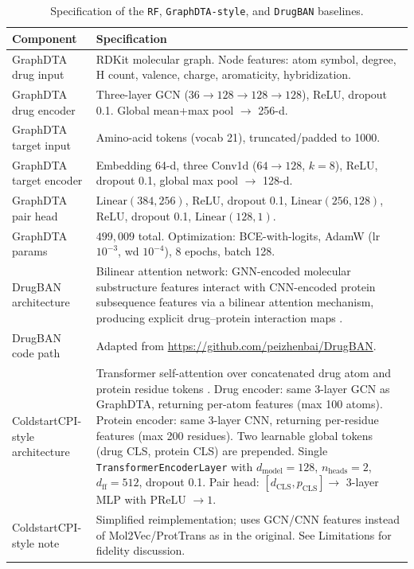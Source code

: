 \documentclass[referee,pdflatex,sn-basic,Numbered]{sn-jnl}
\begin{document}
\begin{appendices}
\begin{table}[t]
  \centering
  \scriptsize
  \caption{Specification of the \texttt{RF}, \texttt{GraphDTA-style}, and \texttt{DrugBAN} baselines.}
  \label{tab:graph-spec}
  \setlength{\tabcolsep}{3.5pt}
  \begin{tabular*}{\textwidth}{@{\extracolsep{\fill}}lp{}@{}}
    \toprule
    Component & Specification \\
    \midrule
    GraphDTA drug input & RDKit molecular graph. Node features: atom symbol, degree, H count, valence, charge, aromaticity, hybridization. \\
    GraphDTA drug encoder & Three-layer GCN ($36 \to 128 \to 128 \to 128$), ReLU, dropout 0.1. Global mean+max pool $\to$ 256-d. \\
    GraphDTA target input & Amino-acid tokens (vocab 21), truncated/padded to 1000. \\
    GraphDTA target encoder & Embedding 64-d, three Conv1d ($64 \to 128$, $k=8$), ReLU, dropout 0.1, global max pool $\to$ 128-d. \\
    GraphDTA pair head & $\mathrm{Linear}(384,256)$, ReLU, dropout 0.1, $\mathrm{Linear}(256,128)$, ReLU, dropout 0.1, $\mathrm{Linear}(128,1)$. \\
    GraphDTA params & $499{,}009$ total. Optimization: BCE-with-logits, AdamW (lr $10^{-3}$, wd $10^{-4}$), 8 epochs, batch 128. \\
    \midrule
    DrugBAN architecture & Bilinear attention network: GNN-encoded molecular substructure features interact with CNN-encoded protein subsequence features via a bilinear attention mechanism, producing explicit drug--protein interaction maps \citep{bai2023drugban}. \\
    DrugBAN code path & Adapted from \url{https://github.com/peizhenbai/DrugBAN}. \\
    \midrule
    ColdstartCPI-style architecture & Transformer self-attention over concatenated drug atom and protein residue tokens \citep{zhao2025coldstartcpi}. Drug encoder: same 3-layer GCN as GraphDTA, returning per-atom features (max 100 atoms). Protein encoder: same 3-layer CNN, returning per-residue features (max 200 residues). Two learnable global tokens (drug CLS, protein CLS) are prepended. Single \texttt{TransformerEncoderLayer} with $d_\text{model}=128$, $n_\text{heads}=2$, $d_\text{ff}=512$, dropout 0.1. Pair head: $[d_\text{CLS}, p_\text{CLS}] \to$ 3-layer MLP with PReLU $\to 1$. \\
    ColdstartCPI-style note & Simplified reimplementation; uses GCN/CNN features instead of Mol2Vec/ProtTrans as in the original. See Limitations for fidelity discussion. \\

\end{tabular*}
\end{table}
\end{appendices}
\end{document}

